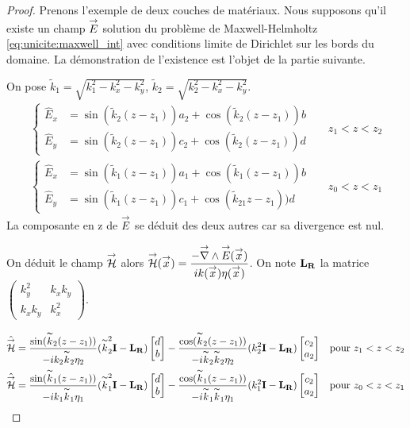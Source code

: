 \begin{proof}
  Prenons l'exemple de deux couches de matériaux.
  Nous supposons qu'il existe un champ \({\overset{\rightarrow}{E}}\) solution du problème de Maxwell-Helmholtz \eqref{eq:unicite:maxwell_int} avec conditions limite de Dirichlet sur les bords du domaine. La démonstration de l'existence est l'objet de la partie suivante.

  \newcommand{\kk}{\tilde{k}}

  On pose \(\kk_1 = \sqrt{k_1^2 - k_x^2 - k_y^2}\),  \(\kk_2 = \sqrt{k_2^2 - k_x^2 - k_y^2}\).
  \begin{align*}
    \left\lbrace
    \begin{aligned}
      \hat{E}_x &= \sin(\kk_2(z-z_1))a_2 +  \cos(\kk_2(z-z_1))b
      \\
      \hat{E}_y &= \sin(\kk_2(z-z_1))c_2 +  \cos(\kk_2(z-z_1))d
    \end{aligned}
    \right. && z_1 < z < z_2
    \\
    \left\lbrace
    \begin{aligned}
      \hat{E}_x &= \sin(\kk_1(z-z_1))a_1 +  \cos(\kk_1(z-z_1))b
      \\
      \hat{E}_y &= \sin(\kk_1(z-z_1))c_1 +  \cos(\kk_21z-z_1))d
    \end{aligned}
    \right. && z_0 < z < z_1
  \end{align*}
  La composante en z de \({\overset{\rightarrow}{E}}\) se déduit des deux autres car sa divergence est nul.

  On déduit le champ \({\overset{\rightarrow}{\mathcal{H}}}\) alors \({\overset{\rightarrow}{\mathcal{H}}}({\overset{\rightarrow}{x}}) = \dfrac{-{\overset{\rightarrow}{\nabla}}\wedge{{\overset{\rightarrow}{E}}}({\overset{\rightarrow}{x}})}{i k({\overset{\rightarrow}{x}})\eta({\overset{\rightarrow}{x}})}\). On note \(\mathbf{L_R}\) la matrice \(
  \begin{pmatrix}
      k_y^2 & k_xk_y
      \\
      k_xk_y & k_x^2
  \end{pmatrix}\).

  \begin{align*}
    \hat{\vH} &= \frac{\sin(\kk_2(z-z_1))}{-i k_2\kk_2 \eta_2}(\kk_2^2 \mI - \mLR)\begin{bmatrix}d \\ b\end{bmatrix} - \frac{\cos(\kk_2(z-z_1))}{-i \kk_2\kk_2 \eta_2}(k_2^2 \mI - \mLR)\begin{bmatrix}c_2 \\ a_2\end{bmatrix} && \text{pour } z_1 < z < z_2
    \\
    \hat{\vH} &= \frac{\sin(\kk_1(z-z_1))}{-i k_1\kk_1 \eta_1}(\kk_1^2 \mI - \mLR)\begin{bmatrix}d \\ b\end{bmatrix} - \frac{\cos(\kk_1(z-z_1))}{-i \kk_1\kk_1 \eta_1}(k_1^2 \mI - \mLR)\begin{bmatrix}c_2 \\ a_2\end{bmatrix} && \text{pour } z_0 < z < z_1
  \end{align*}


\end{proof}
